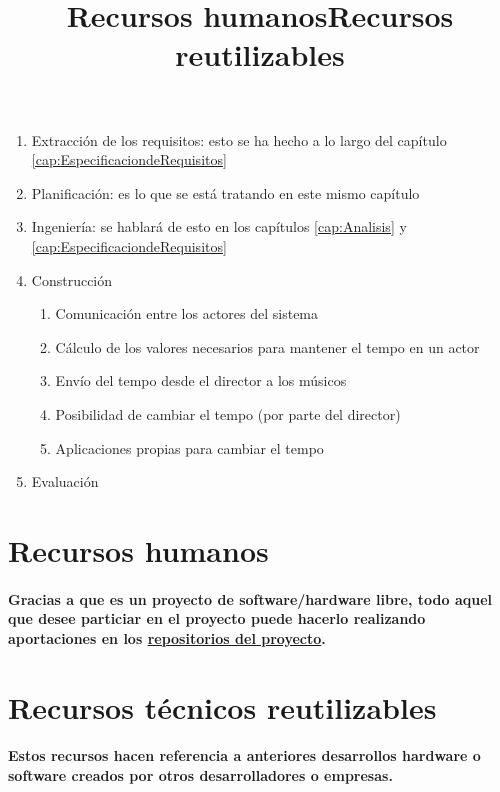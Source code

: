 \begin{enumerate}
  \item Extracción de los requisitos: esto se ha hecho a lo largo del capítulo \ref{cap:EspecificaciondeRequisitos}
  \item Planificación: es lo que se está tratando en este mismo capítulo
  \item Ingeniería: se hablará de esto en los capítulos  \ref{cap:Analisis} y  \ref{cap:EspecificaciondeRequisitos}
  \item Construcción
    \begin{enumerate}
      \item Comunicación entre los actores del sistema
      \item Cálculo de los valores necesarios para mantener el tempo en un actor
      \item Envío del tempo desde el director a los músicos
      \item Posibilidad de cambiar el tempo (por parte del director)
      \item Aplicaciones propias para cambiar el tempo
    \end{enumerate}
  \item Evaluación
\end{enumerate}



\title{Recursos humanos}
\section{Recursos humanos}

\paragraph{
Gracias a que es un proyecto de software/hardware libre, todo aquel que
desee particiar en el proyecto puede hacerlo realizando aportaciones en los
\href{https://github.com/iblancasa/ArduBand}{repositorios del proyecto}.
}


\title{Recursos reutilizables}
\section{Recursos técnicos reutilizables}

\paragraph{
Estos recursos hacen referencia a anteriores desarrollos hardware o software creados
por otros desarrolladores o empresas.
}

